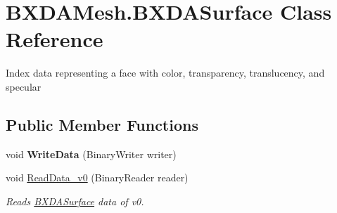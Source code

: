 \hypertarget{class_b_x_d_a_mesh_1_1_b_x_d_a_surface}{}\section{B\+X\+D\+A\+Mesh.\+B\+X\+D\+A\+Surface Class Reference}
\label{class_b_x_d_a_mesh_1_1_b_x_d_a_surface}


Index data representing a face with color, transparency, translucency, and specular  


\subsection*{Public Member Functions}
\begin{DoxyCompactItemize}
\item 
\mbox{\label{class_b_x_d_a_mesh_1_1_b_x_d_a_surface_ac39fb3d5e0f93394530fc8cdecf9874e}} 
void {\bfseries Write\+Data} (Binary\+Writer writer)
\item 
void \hyperlink{class_b_x_d_a_mesh_1_1_b_x_d_a_surface_a05ef413dafc79022f79763330340e61d}{Read\+Data\+\_\+v0} (Binary\+Reader reader)
\begin{DoxyCompactList}\small\item\em Reads \hyperlink{class_b_x_d_a_mesh_1_1_b_x_d_a_surface}{B\+X\+D\+A\+Surface} data of v0. \end{DoxyCompactList}\end{DoxyCompactItemize}
